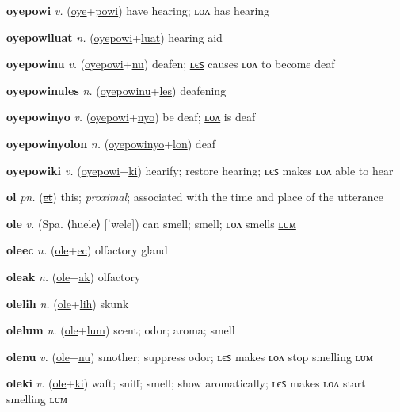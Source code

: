 \textbf{\hypertarget{oyepowi}{oyepowi}} \textit{v.} (\hyperlink{oye}{oye}+\allowbreak \hyperlink{powi}{powi})
have hearing; ʟᴏᴧ has hearing

\textbf{\hypertarget{oyepowiluat}{oyepowiluat}} \textit{n.} (\hyperlink{oyepowi}{oyepowi}+\allowbreak \hyperlink{luat}{luat})
hearing aid

\textbf{\hypertarget{oyepowinu}{oyepowinu}} \textit{v.} (\hyperlink{oyepowi}{oyepowi}+\allowbreak \hyperlink{nu}{nu})
deafen; \hyperlink{oyepowinules}{ʟєꜱ} causes ʟᴏᴧ to become deaf

\textbf{\hypertarget{oyepowinules}{oyepowinules}} \textit{n.} (\hyperlink{oyepowinu}{oyepowinu}+\allowbreak \hyperlink{les}{les})
deafening

\textbf{\hypertarget{oyepowinyo}{oyepowinyo}} \textit{v.} (\hyperlink{oyepowi}{oyepowi}+\allowbreak \hyperlink{nyo}{nyo})
be deaf; \hyperlink{oyepowinyolon}{ʟᴏᴧ} is deaf

\textbf{\hypertarget{oyepowinyolon}{oyepowinyolon}} \textit{n.} (\hyperlink{oyepowinyo}{oyepowinyo}+\allowbreak \hyperlink{lon}{lon})
deaf

\textbf{\hypertarget{oyepowiki}{oyepowiki}} \textit{v.} (\hyperlink{oyepowi}{oyepowi}+\allowbreak \hyperlink{ki}{ki})
hearify; restore hearing; ʟєꜱ makes ʟᴏᴧ able to hear

\textbf{\hypertarget{ol}{ol}} \textit{pn.} (\hyperlink{et}{\sout{et}})
this; \textit{proximal}; associated with the time and place of the utterance

\textbf{\hypertarget{ole}{ole}} \textit{v.} (Spa. ⟨huele⟩ [ˈwele])
can smell; smell; ʟᴏᴧ smells \hyperlink{olelum}{ʟᴜᴍ}

\textbf{\hypertarget{oleec}{oleec}} \textit{n.} (\hyperlink{ole}{ole}+\allowbreak \hyperlink{ec}{ec})
olfactory gland

\textbf{\hypertarget{oleak}{oleak}} \textit{n.} (\hyperlink{ole}{ole}+\allowbreak \hyperlink{ak}{ak})
olfactory

\textbf{\hypertarget{olelih}{olelih}} \textit{n.} (\hyperlink{ole}{ole}+\allowbreak \hyperlink{lih}{lih})
skunk

\textbf{\hypertarget{olelum}{olelum}} \textit{n.} (\hyperlink{ole}{ole}+\allowbreak \hyperlink{lum}{lum})
scent; odor; aroma; smell

\textbf{\hypertarget{olenu}{olenu}} \textit{v.} (\hyperlink{ole}{ole}+\allowbreak \hyperlink{nu}{nu})
smother; suppress odor; ʟєꜱ makes ʟᴏᴧ stop smelling ʟᴜᴍ

\textbf{\hypertarget{oleki}{oleki}} \textit{v.} (\hyperlink{ole}{ole}+\allowbreak \hyperlink{ki}{ki})
waft; sniff; smell; show aromatically; ʟєꜱ makes ʟᴏᴧ start smelling ʟᴜᴍ

